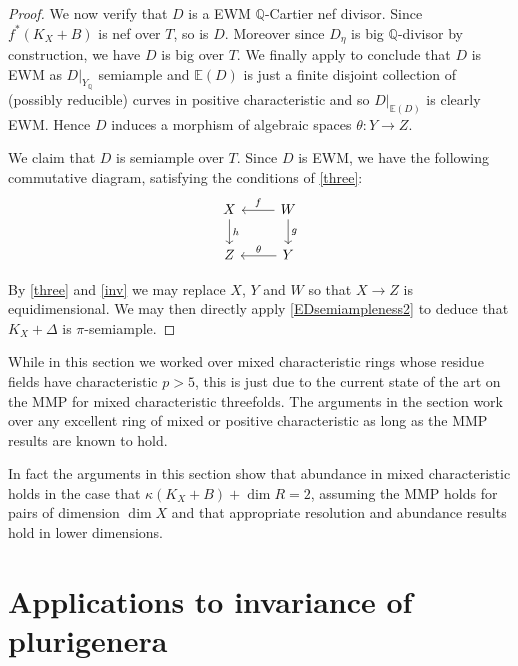 \begin{proof}
		We now verify that $D$ is a EWM $\mathbb{Q}$-Cartier nef divisor.
		Since $f^{*}(K_{X}+B)$ is nef over $T$, so is $D$. Moreover since $D_\eta$ is big $\mathbb{Q}$-divisor by construction, we have $D$ is big over $T$. 
		We finally apply \cite[Theorem 6.1]{witaszek2020keels} to conclude that $D$ is EWM as $D|_{Y_{\mathbb{Q}}}$ semiample and ${\mathbb{E}(D)}$ is just a finite disjoint collection of (possibly reducible) curves in positive characteristic and so $D|_{\mathbb{E}(D)}$ is clearly EWM. Hence $D$ induces a morphism of algebraic spaces $\theta \colon Y \to Z$.
		
		We claim that $D$ is semiample over $T$. 
		Since $D$ is EWM, we have the following commutative diagram, satisfying the conditions of \autoref{three}:
		\[\begin{tikzcd}
		X \arrow[d, "h"] & W \arrow[d, "g"] \arrow[l, "f"'] \\
		Z                & Y \arrow[l, "\theta"']             
		\end{tikzcd}\]
		
		By \autoref{three} and \autoref{inv} we may replace $X$, $Y$ and $W$ so that $X \to Z$ is equidimensional. We may then directly apply \autoref{EDsemiampleness2} to deduce that $K_{X}+\Delta$ is $\pi$-semiample.
	\end{proof}
	
	\begin{remark}
		While in this section we worked over mixed characteristic rings whose residue fields have characteristic $p> 5$, this is just due to the current state of the art on the MMP for mixed characteristic threefolds. The arguments in the section work over any excellent ring of mixed or positive characteristic as long as the MMP results are known to hold.
		
		In fact the arguments in this section show that abundance in mixed characteristic holds in the case that $\kappa(K_{X}+B)+\dim R = 2$, assuming the MMP holds for pairs of dimension $\dim X $ and that appropriate resolution and abundance results hold in lower dimensions. 
	\end{remark}
	
	\section{Applications to invariance of plurigenera}\label{s-inv-plurigenera}
	
